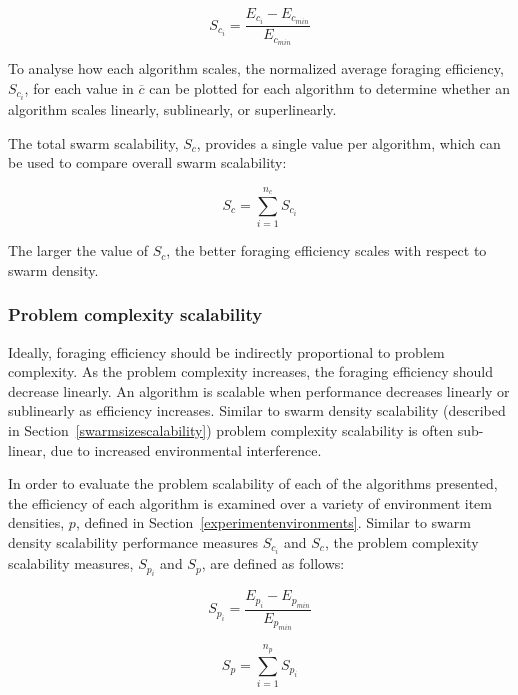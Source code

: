 \documentclass[preprint,12pt]{elsarticle}
\begin{document}
\begin{equation}
S_{c_i} = \dfrac{E_{c_{i}} - E_{c_{min}}}{E_{c_{min}}}
\end{equation}


To analyse how each algorithm scales, the normalized average foraging efficiency, $S_{c_i}$, for each value in $\overline{c}$ can be plotted for each algorithm to determine whether an algorithm scales linearly, sublinearly, or superlinearly. 

The total swarm scalability, $S_c$, provides a single value per algorithm, which can be used to compare overall swarm scalability:

\begin{equation}
	S_c = \sum_{i=1}^{n_c} S_{c_i}
\end{equation}


The larger the value of $S_c$, the better foraging efficiency scales with respect to swarm density. 


\subsubsection{Problem complexity scalability}
\label{setup:problemscalability}

Ideally, foraging efficiency should be indirectly proportional to problem complexity. As the problem complexity increases, the foraging efficiency should decrease linearly. An algorithm is scalable when performance decreases linearly or sublinearly as efficiency increases. Similar to swarm density scalability (described in Section~\ref{swarmsizescalability}) problem complexity scalability is often sub-linear, due to increased environmental interference. 

In order to evaluate the problem scalability of each of the algorithms presented, the efficiency of each algorithm is examined over a variety of environment item densities, $p$, defined in Section~\ref{experimentenvironments}. Similar to swarm density scalability performance measures $S_{c_i}$ and $S_c$, the problem complexity scalability measures, $S_{p_i}$ and $S_p$, are defined as follows:

\begin{equation}
	S_{p_i} = \dfrac{E_{p_{i}} - E_{p_{min}}}{E_{p_{min}}}
\end{equation}

\begin{equation}
	S_p = \sum_{i=1}^{n_p} S_{p_i}
\end{equation}
\end{document}
